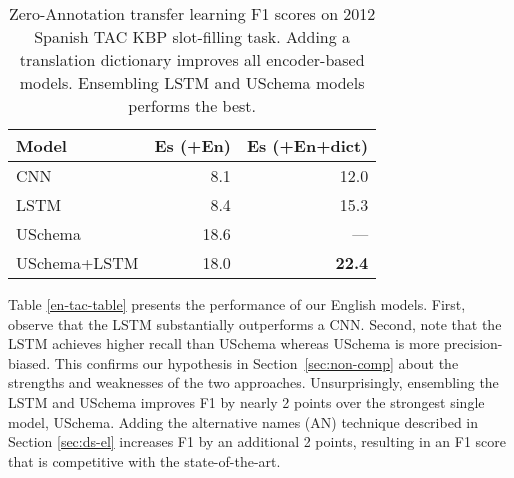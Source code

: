 \begin{table}[h!]
\vspace{-.15cm}

\begin{center}
\caption{Zero-Annotation transfer learning F1 scores on 2012 Spanish TAC KBP slot-filling task. Adding a translation dictionary improves all encoder-based models. Ensembling LSTM and USchema models performs the best. \label{es-tac-table}}
\begin{tabular}{|lrr|}
\hline
\bf Model & \bf Es (+En) & \bf Es (+En+dict)  \\
\hline\hline
CNN 		                    & 8.1     & 12.0	\\
LSTM 	                        & 8.4     & 15.3   \\
USchema                         & 18.6     & --- \\
\hline
USchema+LSTM                    & 18.0     & \bf 22.4 \\
\hline
\end{tabular}
\end{center}
\vspace{-.15cm}
\end{table}




Table \ref{en-tac-table} presents the performance of our English models. First, observe that the LSTM substantially outperforms a CNN. Second, note that the LSTM achieves higher recall than USchema whereas USchema is more precision-biased. This confirms our hypothesis in Section~\ref{sec:non-comp} about the strengths and weaknesses of the two approaches. 
Unsurprisingly, ensembling the LSTM and USchema improves F1 by nearly 2 points over the strongest single model, USchema. Adding the alternative names (AN) technique described in Section \ref{sec:ds-el} increases F1 by an additional 2 points, resulting in an F1 score that is competitive with the state-of-the-art.

